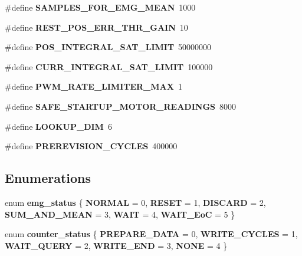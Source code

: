 \begin{DoxyCompactItemize}
\item 
\#define \textbf{ S\+A\+M\+P\+L\+E\+S\+\_\+\+F\+O\+R\+\_\+\+E\+M\+G\+\_\+\+M\+E\+AN}~1000
\item 
\#define \textbf{ R\+E\+S\+T\+\_\+\+P\+O\+S\+\_\+\+E\+R\+R\+\_\+\+T\+H\+R\+\_\+\+G\+A\+IN}~10
\item 
\#define \textbf{ P\+O\+S\+\_\+\+I\+N\+T\+E\+G\+R\+A\+L\+\_\+\+S\+A\+T\+\_\+\+L\+I\+M\+IT}~50000000
\item 
\#define \textbf{ C\+U\+R\+R\+\_\+\+I\+N\+T\+E\+G\+R\+A\+L\+\_\+\+S\+A\+T\+\_\+\+L\+I\+M\+IT}~100000
\item 
\mbox{\label{globals_8h_adf1a94447aeafa5087c7190375b7ccd9}} 
\#define {\bfseries P\+W\+M\+\_\+\+R\+A\+T\+E\+\_\+\+L\+I\+M\+I\+T\+E\+R\+\_\+\+M\+AX}~1
\item 
\#define \textbf{ S\+A\+F\+E\+\_\+\+S\+T\+A\+R\+T\+U\+P\+\_\+\+M\+O\+T\+O\+R\+\_\+\+R\+E\+A\+D\+I\+N\+GS}~8000
\item 
\#define \textbf{ L\+O\+O\+K\+U\+P\+\_\+\+D\+IM}~6
\item 
\#define \textbf{ P\+R\+E\+R\+E\+V\+I\+S\+I\+O\+N\+\_\+\+C\+Y\+C\+L\+ES}~400000
\end{DoxyCompactItemize}
\subsection*{Enumerations}
\begin{DoxyCompactItemize}
\item 
enum \textbf{ emg\+\_\+status} \{ \newline
\textbf{ N\+O\+R\+M\+AL} = 0, 
\textbf{ R\+E\+S\+ET} = 1, 
\textbf{ D\+I\+S\+C\+A\+RD} = 2, 
\textbf{ S\+U\+M\+\_\+\+A\+N\+D\+\_\+\+M\+E\+AN} = 3, 
\newline
\textbf{ W\+A\+IT} = 4, 
\textbf{ W\+A\+I\+T\+\_\+\+EoC} = 5
 \}
\item 
enum \textbf{ counter\+\_\+status} \{ \newline
\textbf{ P\+R\+E\+P\+A\+R\+E\+\_\+\+D\+A\+TA} = 0, 
\textbf{ W\+R\+I\+T\+E\+\_\+\+C\+Y\+C\+L\+ES} = 1, 
\textbf{ W\+A\+I\+T\+\_\+\+Q\+U\+E\+RY} = 2, 
\textbf{ W\+R\+I\+T\+E\+\_\+\+E\+ND} = 3, 
\newline
\textbf{ N\+O\+NE} = 4
 \}
\end{DoxyCompactItemize}
